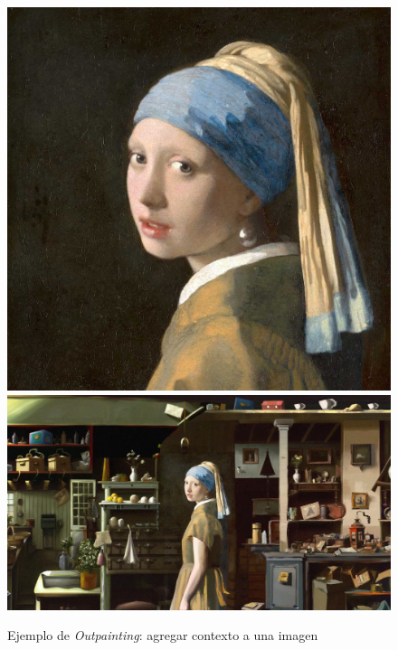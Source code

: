 \documentclass[runningheads]{llncs} %
\begin{document}
\begin{figure}
    \centering
    \includegraphics[scale=0.15]{ej2.1-dalle.jpg}
    \includegraphics[scale=0.2]{ej2.2-dalle.jpg}
    \caption{Ejemplo de \textit{Outpainting}: agregar contexto a una
    imagen \cite{ej-dalle}}
    \label{fig:dalle-ej2}
\end{figure}
\end{document}
